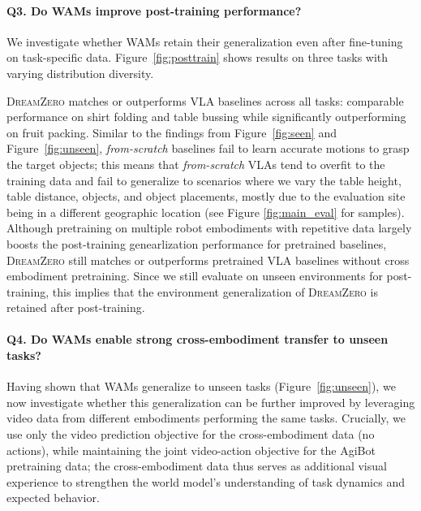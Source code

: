 \documentclass[10pt,logo,copyright]{nvidiatechreport}
\newcommand{\ourmethod}{\mbox{\textsc{DreamZero}}\xspace}
\begin{document}

\paragraph{Q3. Do WAMs improve post-training performance?}


We investigate whether WAMs retain their generalization even after fine-tuning on task-specific data. Figure~\ref{fig:posttrain} shows results on three tasks with varying distribution diversity.

\ourmethod matches or outperforms VLA baselines across all tasks: comparable performance on shirt folding and table bussing while significantly outperforming on fruit packing. Similar to the findings from Figure~\ref{fig:seen} and Figure~\ref{fig:unseen}, \textit{from-scratch} baselines fail to learn accurate motions to grasp the target objects; this means that \textit{from-scratch} VLAs tend to overfit to the training data and fail to generalize to scenarios where we vary the table height, table distance, objects, and object placements, mostly due to the evaluation site being in a different geographic location (see Figure \ref{fig:main_eval} for samples). Although pretraining on multiple robot embodiments with repetitive data largely boosts the post-training genearlization performance for pretrained baselines, \ourmethod still matches or outperforms pretrained VLA baselines without cross embodiment pretraining. Since we still evaluate on unseen environments for post-training, this implies that the environment generalization of \ourmethod is retained after post-training.

\paragraph{Q4. Do WAMs enable strong cross-embodiment transfer to unseen tasks?}

Having shown that WAMs generalize to unseen tasks (Figure~\ref{fig:unseen}), we now investigate whether this generalization can be further improved by leveraging video data from different embodiments performing the same tasks. Crucially, we use only the video prediction objective for the cross-embodiment data (no actions), while maintaining the joint video-action objective for the AgiBot pretraining data; the cross-embodiment data thus serves as additional visual experience to strengthen the world model's understanding of task dynamics and expected behavior.
\end{document}
